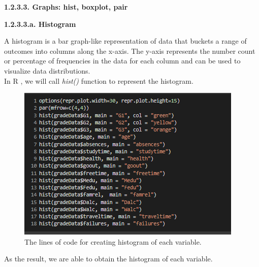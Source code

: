 \documentclass[a4paper]{article}
\begin{document}

\textbf{1.2.3.3. Graphs: hist, boxplot, pair \\ \newline}
\textbf{1.2.3.3.a. Histogram \\ \newline} 
A histogram is a bar graph-like representation of data that buckets a range of outcomes into columns along the x-axis. The y-axis represents the number count or percentage of frequencies in the data for each column and can be used to visualize data distributions. \\ \newline
In R , we will call \textit{hist()} function to represent the histogram.
\begin{figure}[H]
    \centering
    \includegraphics[scale = 1.5]{Images/8.PNG}
    \caption{The lines of code for creating histogram of each variable.}
    \label{fig:hist1}
\end{figure}
As the result, we are able to obtain the histogram of each variable.
\end{document}
